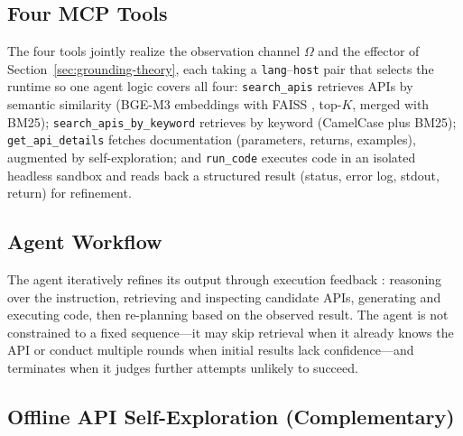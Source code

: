 \subsection{Four MCP Tools}
\label{sec:mcp-tools}

The four tools jointly realize the observation channel $\Omega$ and the effector of Section~\ref{sec:grounding-theory}, each taking a \texttt{lang}--\texttt{host} pair that selects the runtime so one agent logic covers all four: \texttt{search\_apis} retrieves APIs by semantic similarity (BGE-M3 embeddings \cite{bge2024} with FAISS \cite{douze2024faiss}, top-$K$, merged with BM25); \texttt{search\_apis\_by\_keyword} retrieves by keyword (CamelCase plus BM25); \texttt{get\_api\_details} fetches documentation (parameters, returns, examples), augmented by self-exploration; and \texttt{run\_code} executes code in an isolated headless sandbox and reads back a structured result (status, error log, stdout, return) for refinement.

\subsection{Agent Workflow}
\label{sec:agent-workflow}

The agent iteratively refines its output through execution feedback \cite{cline2024cline}: reasoning over the instruction, retrieving and inspecting candidate APIs, generating and executing code, then re-planning based on the observed result. The agent is not constrained to a fixed sequence---it may skip retrieval when it already knows the API or conduct multiple rounds when initial results lack confidence---and terminates when it judges further attempts unlikely to succeed.

\subsection{Offline API Self-Exploration (Complementary)}
\label{sec:selfdoc}

